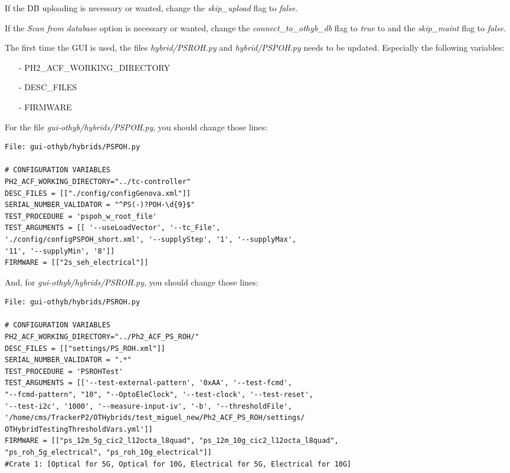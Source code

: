 \documentclass[10pt,a4paper]{article}
\begin{document}
If the DB uploading is necessary or wanted, change the \emph{skip\_upload} flag to \emph{false}.

If the \textit{Scan from database} option is necessary or wanted, change the \emph{connect\_to\_othyb\_db} flag to \emph{true} to and the \emph{skip\_maint} flag to \emph{false}.

The first time the GUI is used, the files \emph{hybrid/PSROH.py} and \emph{hybrid/PSPOH.py} needs to be updated. Especially the following variables:
\begin{itemize}
\item[-] PH2\_ACF\_WORKING\_DIRECTORY
\item[-] DESC\_FILES
\item[-] FIRMWARE
\end{itemize}

For the file \emph{gui-othyb/hybrids/PSPOH.py}, you should change those lines:

\begin{framed}
\begin{verbatim}
File: gui-othyb/hybrids/PSPOH.py

# CONFIGURATION VARIABLES
PH2_ACF_WORKING_DIRECTORY="../tc-controller"
DESC_FILES = [["./config/configGenova.xml"]]
SERIAL_NUMBER_VALIDATOR = "^PS(-)?POH-\d{9}$"
TEST_PROCEDURE = 'pspoh_w_root_file'
TEST_ARGUMENTS = [[ '--useLoadVector', '--tc_File', 
'./config/configPSPOH_short.xml', '--supplyStep', '1', '--supplyMax', 
'11', '--supplyMin', '8']]
FIRMWARE = [["2s_seh_electrical"]] 

\end{verbatim}
\end{framed}

And, for \emph{gui-othyb/hybrids/PSROH.py}, you should change those lines:

\begin{framed}
\begin{verbatim}
File: gui-othyb/hybrids/PSROH.py

# CONFIGURATION VARIABLES
PH2_ACF_WORKING_DIRECTORY="../Ph2_ACF_PS_ROH/"
DESC_FILES = [["settings/PS_ROH.xml"]]
SERIAL_NUMBER_VALIDATOR = ".*"
TEST_PROCEDURE = 'PSROHTest'
TEST_ARGUMENTS = [['--test-external-pattern', '0xAA', '--test-fcmd', 
"--fcmd-pattern", "10", "--OptoEleClock", '--test-clock', '--test-reset', 
'--test-i2c', '1000', '--measure-input-iv', '-b', '--thresholdFile', 
'/home/cms/TrackerP2/OTHybrids/test_miguel_new/Ph2_ACF_PS_ROH/settings/
OTHybridTestingThresholdVars.yml']]
FIRMWARE = [["ps_12m_5g_cic2_l12octa_l8quad", "ps_12m_10g_cic2_l12octa_l8quad", 
"ps_roh_5g_electrical", "ps_roh_10g_electrical"]]       
#Crate 1: [Optical for 5G, Optical for 10G, Electrical for 5G, Electrical for 10G]

\end{verbatim}
\end{framed}
\end{document}
